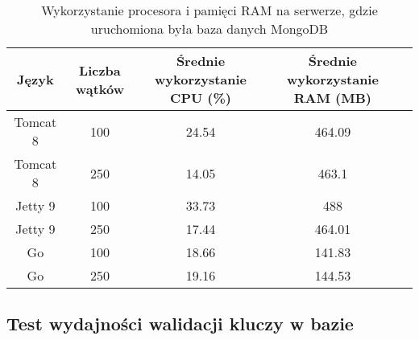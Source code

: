 \begin{table}[!htb]
\centering
\caption{Wykorzystanie procesora i pamięci RAM na serwerze, gdzie uruchomiona była baza danych MongoDB}
\label{tab:mongo-full-api}
\begin{tabular}{@{}ccccl@{}}
\toprule
\textbf{Język} & \textbf{Liczba wątków} & \multicolumn{1}{p{3cm}}{\textbf{Średnie wykorzystanie CPU (\%)}} & \multicolumn{1}{p{3cm}}{\textbf{Średnie wykorzystanie RAM (MB)}} &  \\ \midrule
Tomcat 8       & 100                    & 24.54                             & 464.09                          &  \\
Tomcat 8       & 250                    & 14.05                             & 463.1                          &  \\
Jetty 9       & 100                    & 33.73                             & 488                          &  \\
Jetty 9       & 250                    & 17.44                             & 464.01                          &  \\
Go       & 100                    & 18.66                             & 141.83                          &  \\
Go       & 250                    & 19.16                             & 144.53                          &  \\
\bottomrule
\end{tabular}
\end{table}

 \newpage
 \subsection{Test wydajności walidacji kluczy w bazie}
% 
 \clearpage

